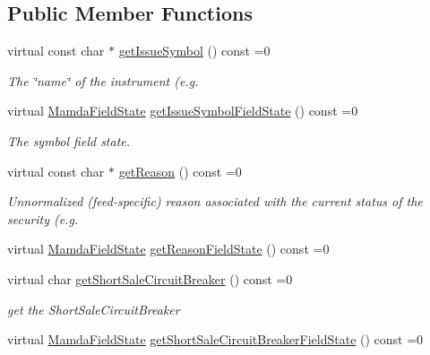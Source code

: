 \subsection*{Public Member Functions}
\begin{CompactItemize}
\item 
virtual const char $\ast$ \hyperlink{classWombat_1_1MamdaSecStatusRecap_0ef9120bb02035510e7aea029ac577ba}{get\-Issue\-Symbol} () const =0
\begin{CompactList}\small\item\em The \char`\"{}name\char`\"{} of the instrument (e.g. \item\end{CompactList}\item 
virtual \hyperlink{namespaceWombat_93aac974f2ab713554fd12a1fa3b7d2a}{Mamda\-Field\-State} \hyperlink{classWombat_1_1MamdaSecStatusRecap_d67e7143d6ebe662b87d76dbbe271dd3}{get\-Issue\-Symbol\-Field\-State} () const =0
\begin{CompactList}\small\item\em The symbol field state. \item\end{CompactList}\item 
virtual const char $\ast$ \hyperlink{classWombat_1_1MamdaSecStatusRecap_f83eee9cbddcaef097d1c2543ea6bf28}{get\-Reason} () const =0
\begin{CompactList}\small\item\em Unnormalized (feed-specific) reason associated with the current status of the security (e.g. \item\end{CompactList}\item 
virtual \hyperlink{namespaceWombat_93aac974f2ab713554fd12a1fa3b7d2a}{Mamda\-Field\-State} \hyperlink{classWombat_1_1MamdaSecStatusRecap_69999d63a62c1c13593814c3833a8473}{get\-Reason\-Field\-State} () const =0
\item 
virtual char \hyperlink{classWombat_1_1MamdaSecStatusRecap_80cb008d40d5435b74a3852926d3caa5}{get\-Short\-Sale\-Circuit\-Breaker} () const =0
\begin{CompactList}\small\item\em get the Short\-Sale\-Circuit\-Breaker \item\end{CompactList}\item 
virtual \hyperlink{namespaceWombat_93aac974f2ab713554fd12a1fa3b7d2a}{Mamda\-Field\-State} \hyperlink{classWombat_1_1MamdaSecStatusRecap_ab1dabb0f90d5d2bccb7e6a5c2a80f98}{get\-Short\-Sale\-Circuit\-Breaker\-Field\-State} () const =0

\end{CompactItemize}
